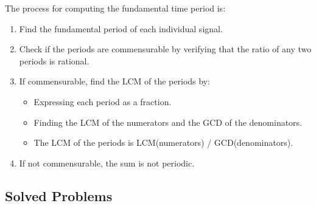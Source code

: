 \documentclass[nohyper,nobib,xcolor=dvipsnames,svgnames,x11names]{tufte-book}
\begin{document}
The process for computing the fundamental time period is:
\begin{enumerate}
\item Find the fundamental period of each individual signal.
\item Check if the periods are commensurable by verifying that the ratio of any two periods is rational.
\item If commensurable, find the LCM of the periods by:
\begin{itemize}
\item Expressing each period as a fraction.
\item Finding the LCM of the numerators and the GCD of the denominators.
\item The LCM of the periods is LCM(numerators) / GCD(denominators).
\end{itemize}
\item If not commensurable, the sum is not periodic.
\end{enumerate}



\subsection{Solved Problems}
\end{document}
